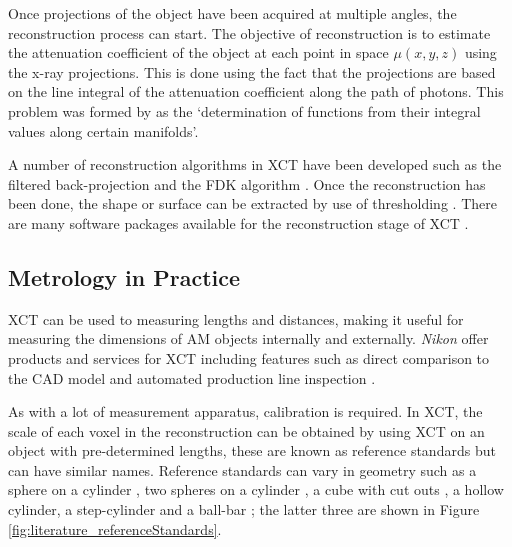 Once projections of the object have been acquired at multiple angles, the reconstruction process can start. The objective of reconstruction is to estimate the attenuation coefficient of the object at each point in space $\mu(x,y,z)$ using the x-ray projections. This is done using the fact that the projections are based on the line integral of the attenuation coefficient along the path of photons. This problem was formed by \cite{radon1986on} as the `determination of functions from their integral values along certain manifolds'.

A number of reconstruction algorithms in XCT have been developed \citep{smith1990cone} such as the filtered back-projection \citep{brooks1976principles} and the FDK algorithm \citep{feldkamp1984practical}. Once the reconstruction has been done, the shape or surface can be extracted by use of thresholding \citep{kruth2011computed}. There are many software packages available for the reconstruction stage of XCT \citep{reinhart2008industrial, sun2012overview}.

\subsection{Metrology in Practice}

XCT can be used to measuring lengths and distances, making it useful for measuring the dimensions of AM objects internally and externally. \emph{Nikon} offer products and services for XCT including features such as direct comparison to the CAD model \citep{nikon2015microfocus, nikon2018mct225} and automated production line inspection \citep{nikon2015inline, nikon2018automated}.

As with a lot of measurement apparatus, calibration is required. In XCT, the scale of each voxel in the reconstruction can be obtained by using XCT on an object with pre-determined lengths, these are known as reference standards \citep{bartscher2007enhancement} but can have similar names. Reference standards can vary in geometry such as a sphere on a cylinder \citep{lifton2013application}, two spheres on a cylinder \citep{sun2016reference}, a cube with cut outs \citep{kiekens2011test}, a hollow cylinder, a step-cylinder and a ball-bar \citep{bartscher2007enhancement}; the latter three are shown in Figure \ref{fig:literature_referenceStandards}.


